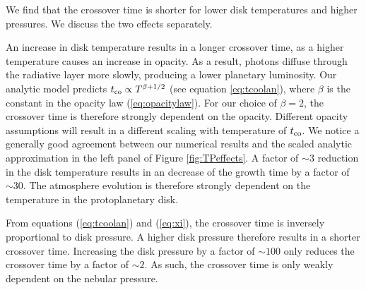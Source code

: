 \documentclass[apj]{emulateapj}
\newcommand{\cb}{_{\rm RCB}}
\begin{document}
We find that the crossover time is shorter for lower disk temperatures and higher pressures. We discuss the two effects separately.

An increase in disk temperature results in a longer crossover time, as a higher temperature causes an increase in opacity. As a result, photons diffuse through the radiative layer more slowly, producing a lower planetary luminosity. Our analytic model predicts $t_{\rm{co}} \propto T^{\beta+ 1/2}$ (see equation \ref{eq:tcoolan}), where $\beta$ is the constant in the opacity law (\ref{eq:opacitylaw}). For our choice of $\beta=2$, the crossover time is therefore strongly dependent on the opacity. Different opacity assumptions will result in a different scaling with temperature of $t_{\rm{co}}$. We notice a generally good agreement between our numerical results and the scaled analytic approximation in the left panel of Figure \ref{fig:TPeffects}. A factor of $\sim 3$ reduction in the disk temperature results in an decrease of the growth time by a factor of $\sim 30$. The atmosphere evolution is therefore strongly dependent on the temperature in the protoplanetary disk.

From equations (\ref{eq:tcoolan}) and (\ref{eq:xi}), the crossover time is inversely proportional to disk pressure. A higher disk pressure therefore results in a shorter crossover time. Increasing the disk pressure by a factor of $\sim 100$ only reduces the crossover time by a factor of $\sim 2$. As such, the crossover time is only weakly dependent on the nebular pressure.




\end{document}
